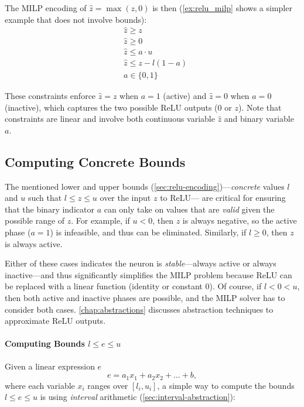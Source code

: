 \documentclass[oneside,11pt,dvipsnames]{book}
\numberwithin{equation}{section}
\theoremstyle{definition}
\theoremstyle{remark}
\begin{document}
The MILP encoding of $\hat{z} = \max(z, 0)$ is then (\autoref{ex:relu_milp} shows a simpler example that does not involve bounds):
\begin{align*}
    &\hat{z} \geq z \\
    &\hat{z} \geq 0 \\
    &\hat{z} \leq a \cdot u \\
    &\hat{z} \leq z - l(1-a) \\
    &a \in \{0,1\}
\end{align*}

These constraints enforce $\hat{z} = z$ when $a = 1$ (active) and $\hat{z} = 0$ when $a = 0$ (inactive), which captures the two possible ReLU outputs ($0$ or $z$).
Note that constraints are linear and involve both continuous variable $\hat{z}$ and binary variable $a$.

\subsection{Computing Concrete Bounds}\label{sec:pre-relu-bounds}

The mentioned lower and upper bounds (\autoref{sec:relu-encoding})---\emph{concrete} values $l$ and $u$ such that $l \leq z \leq u$ over the input $z$ to ReLU--- are critical for ensuring that the binary indicator $a$ can only take on values that are \emph{valid} given the possible range of $z$. For example, if $u < 0$, then $z$ is always negative, so the active phase ($a=1$) is infeasible, and thus can be eliminated.  Similarly, if $l \geq 0$, then $z$ is always active.


Either of these cases indicates the neuron is \emph{stable}---always active or always inactive---and thus significantly simplifies the MILP problem because ReLU can be replaced with a linear function (identity or constant 0). Of course, if $l < 0 < u$, then both active and inactive phases are possible, and the MILP solver has to consider both cases. \autoref{chap:abstractions} discusses abstraction techniques to approximate ReLU outputs.



\paragraph{Computing Bounds $l \le e \le u$}  Given a linear expression $e$
\[
 e = a_1 x_1 + a_2 x_2 + \ldots + b,
\]
where each variable $x_i$ ranges over $[l_i, u_i]$, a simple way to compute the bounds $l \le e \le u$ is using \emph{interval} arithmetic (\autoref{sec:interval-abstraction}):
\end{document}
